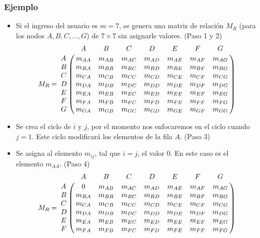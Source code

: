\documentclass[12pt]{article}
\begin{document}
\subsubsection{Ejemplo}
\begin{itemize}
\item Si el ingreso del usuario es $m=7$, se genera una matriz de relaci\'{o}n $M_{R}$ (para los nodos $A, B, C, ..., G$) de $7\times 7$ sin asignarle valores. (Paso 1 y 2)
$$M_{R}=
\bordermatrix{
     &     A     &     B          &     C          &     D          &     E          &     F          &     G          \cr
A    &     m_{AA}&     m_{AB}     &     m_{AC}     &     m_{AD}     &     m_{AE}     &     m_{AF}     &     m_{AG}     \cr
B    &     m_{BA}&     m_{BB}     &     m_{BC}     &     m_{BD}     &     m_{BE}     &     m_{BF}     &     m_{BG}     \cr
C    &     m_{CA}&     m_{CB}     &     m_{CC}     &     m_{CD}     &     m_{CE}     &     m_{CF}     &     m_{CG}     \cr
D    &     m_{DA}&     m_{DB}     &     m_{DC}     &     m_{DD}     &     m_{DE}     &     m_{DF}     &     m_{DG}     \cr
E    &     m_{EA}&     m_{EB}     &     m_{EC}     &     m_{ED}     &     m_{EE}     &     m_{EF}     &     m_{EG}     \cr
F    &     m_{FA}&     m_{FB}     &     m_{FC}     &     m_{FD}     &     m_{FE}     &     m_{FF}     &     m_{FG}     \cr
G    &     m_{GA}&     m_{GB}     &     m_{GC}     &     m_{GD}     &     m_{GE}     &     m_{GF}     &     m_{GG}\cr
}
$$
\item Se crea el ciclo de $i$ y $j$, por el momento nos enfocaremos en el ciclo cuando $j=1$. Este ciclo modificar\'{a} los elementos de la fila $A$. (Paso 3)
\item Se asigna al elemento $m_{ij}$, tal que $i=j$, el valor $0$. En este caso es el elemento $m_{AA}$. (Paso 4)
$$M_{R}=
\bordermatrix{
     &     A     &     B          &     C          &     D          &     E          &     F          &     G          \cr
A    &     0     &     m_{AB}     &     m_{AC}     &     m_{AD}     &     m_{AE}     &     m_{AF}     &     m_{AG}     \cr
B    &     m_{BA}&     m_{BB}     &     m_{BC}     &     m_{BD}     &     m_{BE}     &     m_{BF}     &     m_{BG}     \cr
C    &     m_{CA}&     m_{CB}     &     m_{CC}     &     m_{CD}     &     m_{CE}     &     m_{CF}     &     m_{CG}     \cr
D    &     m_{DA}&     m_{DB}     &     m_{DC}     &     m_{DD}     &     m_{DE}     &     m_{DF}     &     m_{DG}     \cr
E    &     m_{EA}&     m_{EB}     &     m_{EC}     &     m_{ED}     &     m_{EE}     &     m_{EF}     &     m_{EG}     \cr
F    &     m_{FA}&     m_{FB}     &     m_{FC}     &     m_{FD}     &     m_{FE}     &     m_{FF}     &     m_{FG}     \cr
}$$
\end{itemize}
\end{document}
